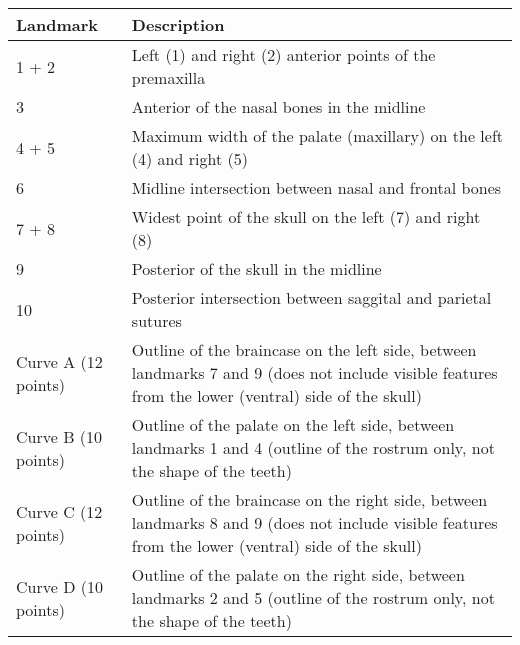 

\begin{tabular}[t]{p{} p{}}		
\hline
\textbf{Landmark} & \textbf{Description} \\
\hline
1 + 2 & Left (1) and right (2) anterior points of the premaxilla \\
3 & Anterior of the nasal bones in the midline \\
4 + 5 &	Maximum width of the palate (maxillary) on the left (4) and right (5)\\
6 & Midline intersection between nasal and frontal bones \\
7 + 8 & Widest point of the skull on the left (7) and right (8) \\
9 &	Posterior of the skull in the midline \\
10 & Posterior intersection between saggital and parietal sutures \\
\hline
Curve A (12 points) & Outline of the braincase on the left side, between landmarks 7 and 9 (does not include visible features from the lower (ventral) side of the skull) \\

Curve B (10 points) & Outline of the palate on the left side, between landmarks 1 and 4 (outline of the rostrum only, not the shape of the teeth)\\

Curve C (12 points) &	Outline of the braincase on the right side, between landmarks 8 and 9 (does not include visible features from the lower (ventral) side of the skull) \\

Curve D (10 points) & Outline of the palate on the right side, between landmarks 2 and 5 (outline of the rostrum only, not the shape of the teeth)\\
\hline
\end{tabular}